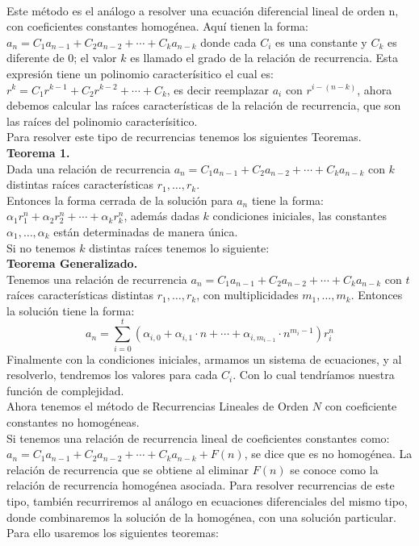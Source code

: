 \documentclass[12pt,twoside]{article}
\begin{document}
\\ Este método es el análogo a resolver una ecuación diferencial lineal de orden n, con coeficientes constantes homogénea. Aquí tienen la forma: 
\\ $a_n=C_1a_{n-1}+C_2a_{n-2}+\dotsm+C_ka_{n-k}$ donde cada $C_i$ es una constante y $C_k$ es diferente de 0; el valor $k$ es llamado el grado de la relación de recurrencia. Esta expresión tiene un polinomio caracterísitico el cual es: 
\\$r^k=C_1r^{k-1}+C_2r^{k-2}+\dotsm+C_k$, es decir reemplazar $a_i$ con $r^{i-(n-k)}$, ahora debemos calcular las raíces características de la relación de recurrencia, que son las raíces del polinomio caracterísitico.
\\ Para resolver este tipo de recurrencias tenemos los siguientes Teoremas.
\\ \textbf{Teorema 1.} 
\\ Dada una relación de recurrencia $a_n=C_1a_{n-1}+C_2a_{n-2}+\dotsm+C_ka_{n-k}$ con $k$ distintas raíces características $r_1,\dotsc,r_k$.
\\ Entonces la forma cerrada de la solución para $a_n$ tiene la forma: 
\\ $\alpha_1r_1^n+\alpha_2r_2^n+\dotsb+\alpha_kr_k^n$, además dadas $k$ condiciones iniciales, las constantes $\alpha_1,\dotsc,\alpha_k$ están determinadas de manera única.
\\ Si no tenemos $k$ distintas raíces tenemos lo siguiente:
\\ \textbf{Teorema Generalizado.}
\\ Tenemos una relación de recurrencia $a_n=C_1a_{n-1}+C_2a_{n-2}+\dotsm+C_ka_{n-k}$ con $t$ raíces características distintas $r_1,\dotsc,r_k$, con multiplicidades $m_1,\dotsc,m_k$. Entonces la solución tiene la forma:
\[ a_n = \sum_{i=0}^{t} (\alpha_{i,0}+\alpha_{i,1}\cdot n+\dotsb+\alpha_{i,m_{i-1}}\cdot n^{m_i-1})r_i^n  \]
Finalmente con la condiciones iniciales, armamos un sistema de ecuaciones, y al resolverlo, tendremos los valores para cada $C_i$. Con lo cual tendríamos nuestra función de complejidad.
\newline
\\ Ahora tenemos el método de Recurrencias Lineales de Orden $N$ con coeficiente constantes no homogéneas.
\\ Si tenemos una relación de recurrencia lineal de coeficientes constantes como: $a_n=C_1a_{n-1}+C_2a_{n-2}+\dotsm+C_ka_{n-k}+F(n)$, se dice que es no homogénea. La relación de recurrencia que se obtiene al eliminar $F(n)$ se conoce como la relación de recurrencia homogénea asociada. Para resolver recurrencias de este tipo, también recurriremos al análogo en ecuaciones diferenciales del mismo tipo, donde combinaremos la solución de la homogénea, con una solución particular. Para ello usaremos los siguientes teoremas:
\end{document}
